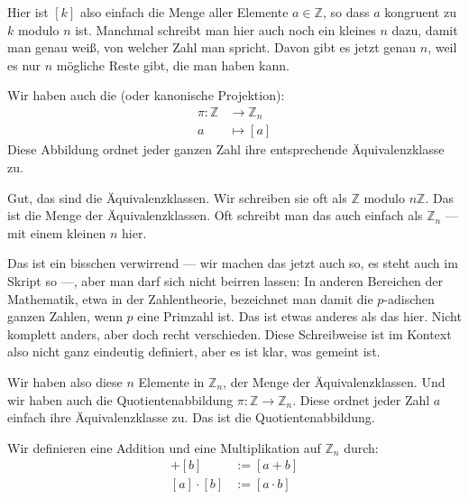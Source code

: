 \begin{spoken-clean}[00:05:33 - 00:06:04]
Hier ist $[k]$ also einfach die Menge aller Elemente $a \in \mathbb{Z}$, so dass $a$ kongruent zu $k$ modulo $n$ ist. Manchmal schreibt man hier auch noch ein kleines $n$ dazu, damit man genau weiß, von welcher Zahl man spricht. Davon gibt es jetzt genau $n$, weil es nur $n$ mögliche Reste gibt, die man haben kann.
\end{spoken-clean}

\begin{math-stroke}[Quotientenabbildung]
Wir haben auch die  (oder kanonische Projektion):
\begin{align*}
\pi: \mathbb{Z} &\to \mathbb{Z}_n \\
a &\mapsto [a]
\end{align*}
Diese Abbildung ordnet jeder ganzen Zahl ihre entsprechende Äquivalenzklasse zu.
\end{math-stroke}

\begin{spoken-clean}[00:06:04 - 00:08:20]
Gut, das sind die Äquivalenzklassen. Wir schreiben sie oft als $\mathbb{Z}$ modulo $n\mathbb{Z}$. Das ist die Menge der Äquivalenzklassen. Oft schreibt man das auch einfach als $\mathbb{Z}_n$ --- mit einem kleinen $n$ hier.

Das ist ein bisschen verwirrend --- wir machen das jetzt auch so, es steht auch im Skript so ---, aber man darf sich nicht beirren lassen: In anderen Bereichen der Mathematik, etwa in der Zahlentheorie, bezeichnet man damit die $p$-adischen ganzen Zahlen, wenn $p$ eine Primzahl ist. Das ist etwas anderes als das hier. Nicht komplett anders, aber doch recht verschieden. Diese Schreibweise ist im Kontext also nicht ganz eindeutig definiert, aber es ist klar, was gemeint ist.

Wir haben also diese $n$ Elemente in $\mathbb{Z}_n$, der Menge der Äquivalenzklassen. Und wir haben auch die Quotientenabbildung $\pi \colon \mathbb{Z} \to \mathbb{Z}_n$. Diese ordnet jeder Zahl $a$ einfach ihre Äquivalenzklasse zu. Das ist die Quotientenabbildung.
\end{spoken-clean}

\begin{math-stroke}
Wir definieren eine Addition und eine Multiplikation auf $\mathbb{Z}_n$ durch:
\begin{align}
[a] + [b] &:= [a + b] \label{eq:add-zn} \\
[a] \cdot [b] &:= [a \cdot b] \label{eq:mul-zn}
\end{align}
\end{math-stroke}

